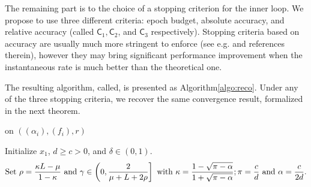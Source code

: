 The remaining part is to the choice of a stopping criterion for the inner loop. We propose to use three different criteria: epoch budget, absolute accuracy, and relative accuracy (called $\mathsf{C}_1, \mathsf{C}_2$, and $\mathsf{C}_3$ respectively). Stopping criteria based on accuracy are usually much more stringent to enforce (see e.g. \cite[Sec.~2.3]{lin2017catalyst} and references therein), however they may bring significant performance improvement when the instantaneous rate is much better than the theoretical one. 

The resulting algorithm, called\;\recoalgo, is presented as Algorithm\;\ref{algo:reco}. Under any of the three stopping criteria, we recover the same convergence result, formalized in the next theorem.

\begin{algorithm}[h!]
\caption{\label{algo:reco}\recoalgo on $((\alpha_i),(f_i),r)$}
Initialize $x_1$, $d\geq c>0$, and $\delta\in(0,1)$.
\begin{align}
\label{eq:set}
 \text{Set } \rho = \frac{\kappa L-\mu}{1-\kappa} \text{ and } \gamma \in \left( 0, \frac{2}{\mu+L+2\rho} \right] \text{ with } \kappa = \frac{1-\sqrt{\pi -\alpha}}{1+\sqrt{\pi-\alpha}}; \pi = \frac{c}{d} \text{ and } \alpha = \frac{c}{2d}.
\end{align}
\end{algorithm}
